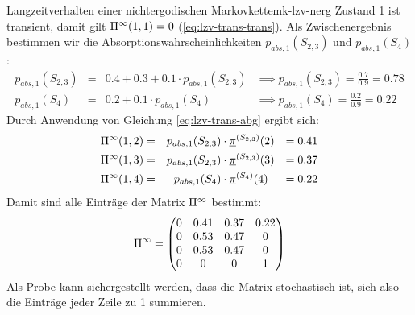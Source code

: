 \begin{example}{Langzeitverhalten einer nichtergodischen Markovkette}{mk-lzv-nerg}
Zustand 1 ist transient, damit gilt $\Pi^\infty(1,1) = 0$
(\eqref{eq:lzv-trans-trans}). Als Zwischenergebnis bestimmen wir die
Absorptionswahrscheinlichkeiten $p_{abs,1}(S_{2,3})$ und $p_{abs,1}(S_{4})$:
\begin{align*}
p_{abs,1}(S_{2,3}) &=&  0.4 + 0.3 + 0.1 \cdot p_{abs,1}(S_{2,3}) & \implies
p_{abs,1}(S_{2,3}) = \frac{0.7}{0.9} = 0.78  \\
p_{abs,1}(S_{4})   &=&  0.2 + 0.1 \cdot p_{abs,1}(S_4) &\implies
p_{abs,1}(S_4) =\frac{0.2}{0.9} = 0.22
\end{align*}
Durch Anwendung von Gleichung \eqref{eq:lzv-trans-abg} ergibt sich:
\begin{align*}
\Pi^\infty(1,2) &=& p_{abs,1}(S_{2,3}) &\cdot\underline{\pi}^{(S_{2,3})}(2) &= 0.41 \\
\Pi^\infty(1,3) &=& p_{abs,1}(S_{2,3}) &\cdot\underline{\pi}^{(S_{2,3})}(3) &= 0.37 \\
\Pi^\infty(1,4) &=& p_{abs,1}(S_4)     &\cdot\underline{\pi}^{(S_4)}    (4) &= 0.22
\end{align*}
Damit sind alle Einträge der Matrix $\Pi^\infty$ bestimmt:
\[
\Pi^\infty = \begin{pmatrix}
   0  & 0.41 & 0.37 & 0.22 \\
   0  & 0.53 & 0.47 &  0   \\
   0  & 0.53 & 0.47 &  0   \\
   0  &  0   &  0   &  1
\end{pmatrix}
\]
Als Probe kann sichergestellt werden, dass die Matrix stochastisch ist, sich
also die Einträge jeder Zeile zu 1 summieren.
\end{example}
